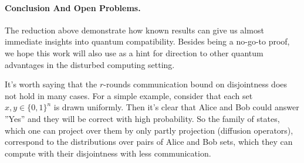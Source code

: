 \documentclass{article}
\begin{document}
\paragraph{Conclusion And Open Problems.} The reduction above demonstrate how known results can give us almost immediate insights into quantum compatibility. Besides being a no-go-to proof, we hope this work will also use as a hint for direction to other quantum advantages in the disturbed computing setting. 

It's worth saying that the $r$-rounds communication bound on disjointness does not hold in many cases. For a simple example, consider that each set $x,y \in \{0,1\}^{n}$ is drawn uniformly. Then it's clear that Alice and Bob could answer ''Yes'' and they will be correct with high probability. So the family of states, which one can project over them by only partly projection (diffusion operators), correspond to the distributions over pairs of Alice and Bob sets, which they can compute with their disjointness with less communication.        
\printbibliography 
\end{document}

